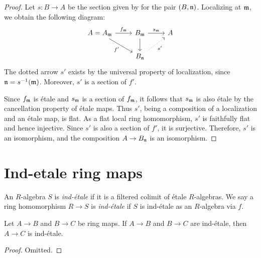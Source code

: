 \begin{proof}
  Let \(s: B \to A\) be the section given by  for the pair \((B, {\mathfrak{n}})\). Localizing at \({\mathfrak{m}}\), we obtain the following diagram:
  \[
  \begin{tikzcd}
    A = A_\m \arrow[r, "f_\m"]\arrow[dr, "f'"'] & B_\m \arrow[d] \arrow[r, "s_\m"] & A \\
    & B_\n \arrow[ur, dotted, "s'"'] &
  \end{tikzcd}
  \]
  The dotted arrow \(s'\) exists by the universal property of localization, since \({\mathfrak{n}} = s^{-1}({\mathfrak{m}})\). Moreover, \(s'\) is a section of \(f'\).

  Since \(f_{\mathfrak{m}}\) is étale and \(s_{\mathfrak{m}}\) is a section of \(f_{\mathfrak{m}}\), it follows that \(s_{\mathfrak{m}}\) is also étale by the cancellation property of étale maps. Thus \(s'\), being a composition of a localization and an étale map, is flat. As a flat local ring homomorphism, \(s'\) is faithfully flat and hence injective. Since \(s'\) is also a section of \(f'\), it is surjective. Therefore, \(s'\) is an isomorphism, and the composition \(A \to B_{\mathfrak{n}}\) is an isomorphism.
\end{proof}

\section{Ind-etale ring maps}

\begin{definition}
    An $R$-algebra $S$ is \emph{ind-étale} if it is a filtered colimit of étale $R$-algebras.
    We say a ring homomorphism $R \to S$ is \emph{ind-étale} if $S$ is ind-étale as an $R$-algebra via $f$.
    \label{def:ind-etale}
    \leanok
\end{definition}

\begin{lemma}
  \label{thm:ind-etale-comp}
  \leanok
  Let $A \to B$ and $B \to C$ be ring maps. If $A \to B$ and $B \to C$ are ind-étale,
  then $A \to C$ is ind-étale.
\end{lemma}

\begin{proof}
  \leanok
  Omitted.
\end{proof}

